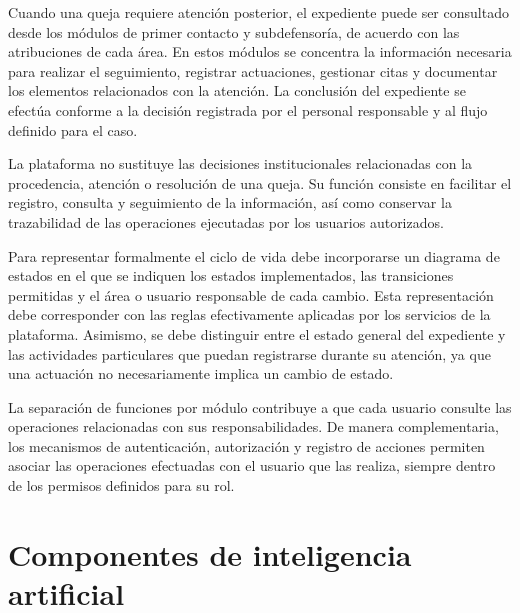 Cuando una queja requiere atención posterior, el expediente puede ser consultado desde los módulos de primer contacto y subdefensoría, de acuerdo con las atribuciones de cada área. En estos módulos se concentra la información necesaria para realizar el seguimiento, registrar actuaciones, gestionar citas y documentar los elementos relacionados con la atención. La conclusión del expediente se efectúa conforme a la decisión registrada por el personal responsable y al flujo definido para el caso.

La plataforma no sustituye las decisiones institucionales relacionadas con la procedencia, atención o resolución de una queja. Su función consiste en facilitar el registro, consulta y seguimiento de la información, así como conservar la trazabilidad de las operaciones ejecutadas por los usuarios autorizados.


Para representar formalmente el ciclo de vida debe incorporarse un diagrama de estados en el que se indiquen los estados implementados, las transiciones permitidas y el área o usuario responsable de cada cambio. Esta representación debe corresponder con las reglas efectivamente aplicadas por los servicios de la plataforma. Asimismo, se debe distinguir entre el estado general del expediente y las actividades particulares que puedan registrarse durante su atención, ya que una actuación no necesariamente implica un cambio de estado.

La separación de funciones por módulo contribuye a que cada usuario consulte las operaciones relacionadas con sus responsabilidades. De manera complementaria, los mecanismos de autenticación, autorización y registro de acciones permiten asociar las operaciones efectuadas con el usuario que las realiza, siempre dentro de los permisos definidos para su rol.

\section{Componentes de inteligencia artificial}
\label{sec:diseno_ia}


